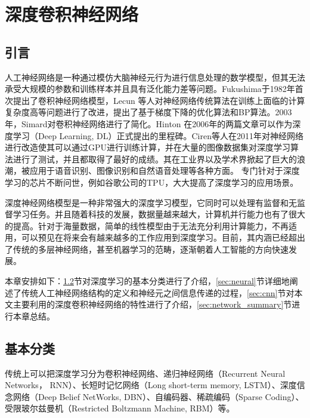 \chapter{深度卷积神经网络}
\label{sec:network}
\section{引言}

人工神经网络是一种通过模仿大脑神经元行为进行信息处理的数学模型，但其无法承受大规模的参数和训练样本并且具有泛化能力差等问题。Fukushima于1982年首次提出了卷积神经网络模型，Lecun 等人对神经网络传统算法在训练上面临的计算复杂度高等问题进行了改进，提出了基于梯度下降的优化算法和BP算法。2003年，Simard对卷积神经网络进行了简化。Hinton 在2006年的两篇文章可以作为深度学习（Deep Learning, DL）正式提出的里程碑。Ciren等人在2011年对神经网络进行改造使其可以通过GPU进行训练计算，并在大量的图像数据集对深度学习算法进行了测试，并且都取得了最好的成绩。其在工业界以及学术界掀起了巨大的浪潮，被应用于语音识别、图像识别和自然语音处理等各种方面。 专门针对于深度学习的芯片不断问世，例如谷歌公司的TPU，大大提高了深度学习的应用场景。

深度神经网络模型是一种非常强大的深度学习模型，它同时可以处理有监督和无监督学习任务。并且随着科技的发展，数据量越来越大，计算机并行能力也有了很大的提高。针对于海量数据，简单的线性模型由于无法充分利用计算能力，不再适用，可以预见在将来会有越来越多的工作应用到深度学习。目前，其内涵已经超出了传统的多层神经网络，甚至机器学习的范畴，逐渐朝着人工智能的方向快速发展。

本章安排如下：\ref{sec:network_classification}节对深度学习的基本分类进行了介绍，\ref{sec:neural}节详细地阐述了传统人工神经网络结构的定义和神经元之间信息传递的过程，\ref{sec:cnn}节对本文主要利用的深度卷积神经网络的特性进行了介绍，\ref{sec:network_summary}节进行本章总结。
\section{基本分类}
\label{sec:network_classification}
传统上可以把深度学习分为卷积神经网络、递归神经网络（Recurrent Neural Networks， RNN）、长短时记忆网络（Long short-term memory, LSTM）、深度信念网络（Deep Belief NetWorks, DBN）、自编码器、稀疏编码（Sparse Coding）、受限玻尔兹曼机（Restricted Boltzmann Machine, RBM）等。

